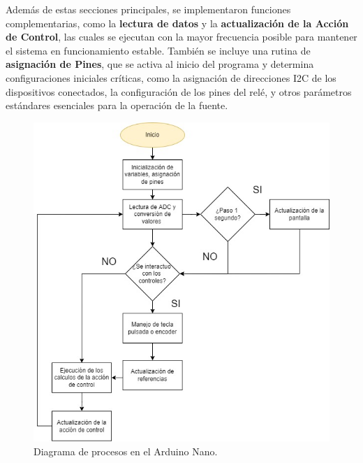 Además de estas secciones principales, se implementaron funciones complementarias, como la \textbf{lectura de datos} y la \textbf{actualización de la Acción de Control}, las cuales se ejecutan con la mayor frecuencia posible para mantener el sistema en funcionamiento estable. También se incluye una rutina de \textbf{asignación de Pines}, que se activa al inicio del programa y determina configuraciones iniciales críticas, como la asignación de direcciones I2C de los dispositivos conectados, la configuración de los pines del relé, y otros parámetros estándares esenciales para la operación de la fuente.

\begin{figure}[H]
    \centering
    \includegraphics[scale=0.5]{./imagenes/DiagramaDeSoftware.jpg}
    \caption{Diagrama de procesos en el Arduino Nano.}
    \label{F:diagrama_de_procesos}
\end{figure}

